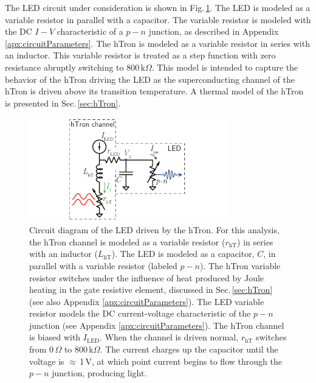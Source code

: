 \documentclass[twocolumn]{article}
\begin{document}
The LED circuit under consideration is shown in Fig.\,\ref{fig:transmitters_LED_circuit}. The LED is modeled as a variable resistor in parallel with a capacitor. The variable resistor is modeled with the DC $I-V$ characteristic of a $p-n$ junction, as described in Appendix \ref{apx:circuitParameters}. The hTron is modeled as a variable resistor in series with an inductor. This variable resistor is treated as a step function with zero resistance abruptly switching to 800\,k$\Omega$. This model is intended to capture the behavior of the hTron driving the LED as the superconducting channel of the hTron is driven above its transition temperature. A thermal model of the hTron is presented in Sec.\,\ref{sec:hTron}.
\begin{figure}[t!]
	\centerline{\includegraphics[width=8.6cm]{_transmitters_LED_circuit_small.pdf}}
	\caption{\label{fig:transmitters_LED_circuit}Circuit diagram of the LED driven by the hTron. For this analysis, the hTron channel is modeled as a variable resistor ($r_{\mathrm{hT}}$) in series with an inductor ($L_{\mathrm{hT}}$). The LED is modeled as a capacitor, $C$, in parallel with a variable resistor (labeled $p-n$). The hTron variable resistor switches under the influence of heat produced by Joule heating in the gate resistive element, discussed in Sec.\,\ref{sec:hTron} (see also Appendix \ref{apx:circuitParameters}). The LED variable resistor models the DC current-voltage characteristic of the $p-n$ junction (see Appendix \ref{apx:circuitParameters}). The hTron channel is biased with $I_{\mathrm{LED}}$. When the channel is driven normal, $r_{\mathrm{hT}}$ switches from 0\,$\Omega$ to $800$\,k$\Omega$. The current charges up the capacitor until the voltage is $\approx$\,1\,V, at which point current begins to flow through the $p-n$ junction, producing light.}
\end{figure}
\end{document}
